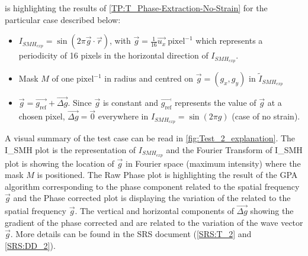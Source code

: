 \documentclass[12pt, titlepage]{article}
\begin{document}
 is highlighting the results of \cref{TP:T_Phase-Extraction-No-Strain} for the particular case described below:
\begin{itemize}
\item $I_{SMH_{exp}}=\sin{(2\pi \overrightarrow{g}\cdot\overrightarrow{r})}$, with $\overrightarrow{g} = \frac{1}{16} \overrightarrow{u_x} \ \text{pixel}^{-1}$ which represents a periodicity of 16 pixels in the horizontal direction of $I_{SMH_{exp}}$. 
\item Mask $M$ of one $\text{pixel}^{-1}$ in radius and centred on $\overrightarrow{g}=(g_x,g_y)$ in $\widetilde{I}_{SMH_{exp}}$
\item $\overrightarrow{g} = \overrightarrow{g_\text{ref}} + \overrightarrow{\Delta g}$. Since $\overrightarrow{g}$ is constant and $\overrightarrow{g_\text{ref}}$ represents the value of $\overrightarrow{g}$ at a chosen pixel, $\overrightarrow{\Delta g} = \overrightarrow{0}$ everywhere in $I_{SMH_{exp}}=\sin{(2\pi g)}$ (case of no strain).
\end{itemize}

A visual summary of the test case can be read in \cref{fig:Test_2_explanation}. The I{\_}SMH plot is the representation of $I_{SMH_{exp}}$ and the Fourier Transform of I{\_}SMH plot is showing the location of $\overrightarrow{g}$ in Fourier space (maximum intensity) where the mask $M$ is positioned. The Raw Phase plot is highlighting the result of the GPA algorithm corresponding to the phase component related to the spatial frequency $\overrightarrow{g}$ and the Phase corrected plot is displaying the variation of the related to the spatial frequency $\overrightarrow{g}$. The vertical and horizontal components of $\overrightarrow{\Delta g}$ showing the gradient of the phase corrected and are related to the variation of the wave vector $\overrightarrow{g}$. More details can be found in the SRS document (\cref{SRS:T_2} and \cref{SRS:DD_2}).
\end{document}
